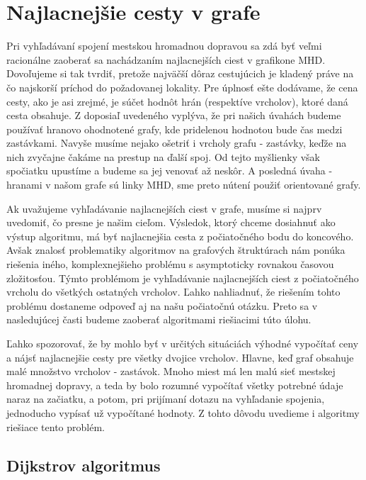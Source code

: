 \section{Najlacnejšie cesty v grafe}

Pri vyhľadávaní spojení mestskou hromadnou dopravou sa zdá byť veľmi racionálne zaoberať sa nachádzaním najlacnejších ciest v grafikone MHD. Dovoľujeme si tak tvrdiť, pretože najväčší dôraz cestujúcich je kladený práve na čo najskorší príchod do požadovanej lokality. Pre úplnosť ešte dodávame, že cena cesty, ako je asi zrejmé, je súčet hodnôt hrán (respektíve vrcholov), ktoré daná cesta obsahuje. Z doposiaľ uvedeného vyplýva, že pri našich úvahách budeme používať hranovo ohodnotené grafy, kde pridelenou hodnotou bude čas medzi zastávkami. Navyše musíme nejako ošetriť i vrcholy grafu - zastávky, keďže na nich zvyčajne čakáme na prestup na ďalší spoj. Od tejto myšlienky však spočiatku upustíme a budeme sa jej venovať až neskôr. A posledná úvaha - hranami v našom grafe sú linky MHD, sme preto nútení použiť orientované grafy.\newline

Ak uvažujeme vyhľadávanie najlacnejších ciest v grafe, musíme si najprv uvedomiť, čo presne je našim cieľom. Výsledok, ktorý chceme dosiahnuť ako výstup algoritmu, má byť najlacnejšia cesta z počiatočného bodu do koncového. Avšak znalosť problematiky algoritmov na grafových štruktúrach nám ponúka riešenia iného, komplexnejšieho problému s asymptoticky rovnakou časovou zložitosťou. Týmto problémom je vyhľadávanie najlacnejších ciest z počiatočného vrcholu do všetkých ostatných vrcholov. Ľahko nahliadnuť, že riešením tohto problému dostaneme odpoveď aj na našu počiatočnú otázku.  Preto sa v nasledujúcej časti budeme zaoberať algoritmami riešiacimi túto úlohu.\newline

Ľahko spozorovať, že by mohlo byť v určitých situáciách výhodné vypočítať ceny a nájsť najlacnejšie cesty pre všetky dvojice vrcholov. Hlavne, keď graf obsahuje malé množstvo vrcholov - zastávok. Mnoho miest má len malú sieť mestskej hromadnej dopravy, a teda by bolo rozumné vypočítať všetky potrebné údaje naraz na začiatku, a potom, pri prijímaní dotazu na vyhľadanie spojenia, jednoducho vypísať už vypočítané hodnoty. Z tohto dôvodu uvedieme i algoritmy riešiace tento problém.\newline


\subsection{Dijkstrov algoritmus}
\label{Dijkstra}

